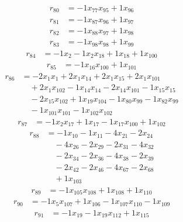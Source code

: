 \[\begin{aligned}
r_{80} &= - 1 x_{77} x_{95} + 1 x_{96}
\end{aligned}\]
\[\begin{aligned}
r_{81} &= - 1 x_{87} x_{96} + 1 x_{97}
\end{aligned}\]
\[\begin{aligned}
r_{82} &= - 1 x_{88} x_{97} + 1 x_{98}
\end{aligned}\]
\[\begin{aligned}
r_{83} &= - 1 x_{98} x_{98} + 1 x_{99}
\end{aligned}\]
\[\begin{aligned}
r_{84} &= - 1 x_{2} - 1 x_{2} x_{18} + 1 x_{18} + 1 x_{100}
\end{aligned}\]
\[\begin{aligned}
r_{85} &= - 1 x_{16} x_{100} + 1 x_{101}
\end{aligned}\]
\[\begin{aligned}
r_{86} &= - 2 x_{1} x_{1} + 2 x_{1} x_{14} + 2 x_{1} x_{15} + 2 x_{1} x_{101} \\
 &\quad + 2 x_{1} x_{102} - 1 x_{14} x_{14} - 2 x_{14} x_{101} - 1 x_{15} x_{15} \\
 &\quad - 2 x_{15} x_{102} + 1 x_{19} x_{104} - 1 x_{80} x_{99} - 1 x_{82} x_{99} \\
 &\quad - 1 x_{101} x_{101} - 1 x_{102} x_{102}
\end{aligned}\]
\[\begin{aligned}
r_{87} &= - 1 x_{2} x_{17} + 1 x_{17} - 1 x_{17} x_{100} + 1 x_{102}
\end{aligned}\]
\[\begin{aligned}
r_{88} &= - 1 x_{10} - 1 x_{11} - 4 x_{21} - 2 x_{24} \\
 &\quad - 4 x_{26} - 2 x_{29} - 2 x_{31} - 4 x_{32} \\
 &\quad - 2 x_{34} - 2 x_{36} - 4 x_{38} - 2 x_{39} \\
 &\quad - 2 x_{42} - 2 x_{46} - 4 x_{67} - 2 x_{68} \\
 &\quad + 1 x_{103}
\end{aligned}\]
\[\begin{aligned}
r_{89} &= - 1 x_{105} x_{108} + 1 x_{108} + 1 x_{110}
\end{aligned}\]
\[\begin{aligned}
r_{90} &= - 1 x_{5} x_{107} + 1 x_{106} - 1 x_{107} x_{110} - 1 x_{109}
\end{aligned}\]
\[\begin{aligned}
r_{91} &= - 1 x_{19} - 1 x_{19} x_{112} + 1 x_{115}
\end{aligned}\]
